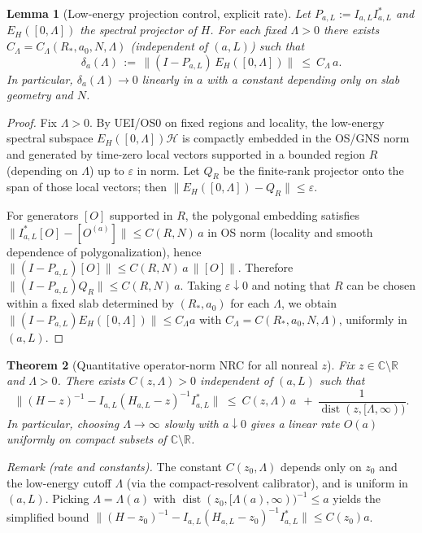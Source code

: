 \documentclass[11pt]{amsart}
\theoremstyle{plain}
\newtheorem{theorem}{Theorem}[section]
\newtheorem{lemma}[theorem]{Lemma}
\theoremstyle{definition}
\theoremstyle{remark}
\begin{document}
\begin{lemma}[Low-energy projection control, explicit rate]\label{lem:low-energy-proj}
Let $P_{a,L}:=I_{a,L}I_{a,L}^*$ and $E_H([0,\Lambda])$ the spectral projector of $H$. For each fixed $\Lambda>0$ there exists $C_\Lambda=C_\Lambda(R_*,a_0,N,\Lambda)$ (independent of $(a,L)$) such that
\[
  \delta_a(\Lambda)
  \,:=\,\big\|(I-P_{a,L})\,E_H([0,\Lambda])\big\|\ \le\ C_\Lambda\,a.
\]
In particular, $\delta_a(\Lambda)\to 0$ linearly in $a$ with a constant depending only on slab geometry and $N$.
\end{lemma}
\begin{proof}
Fix $\Lambda>0$. By UEI/OS0 on fixed regions and locality, the low-energy spectral subspace $E_H([0,\Lambda])\mathcal H$ is compactly embedded in the OS/GNS norm and generated by time-zero local vectors supported in a bounded region $R$ (depending on $\Lambda$) up to $\varepsilon$ in norm. Let $Q_R$ be the finite-rank projector onto the span of those local vectors; then $\|E_H([0,\Lambda]) - Q_R\|\le \varepsilon$.

For generators $[O]$ supported in $R$, the polygonal embedding satisfies $\|I_{a,L}^* [O] - [O^{(a)}]\|\le C(R,N)\,a$ in OS norm (locality and smooth dependence of polygonalization), hence $\|(I-P_{a,L})[O]\|\le C(R,N)\,a\,\|[O]\|$. Therefore $\|(I-P_{a,L})Q_R\|\le C(R,N)\,a$. Taking $\varepsilon\downarrow 0$ and noting that $R$ can be chosen within a fixed slab determined by $(R_*,a_0)$ for each $\Lambda$, we obtain $\|(I-P_{a,L})E_H([0,\Lambda])\|\le C_\Lambda a$ with $C_\Lambda=C(R_*,a_0,N,\Lambda)$, uniformly in $(a,L)$.
\end{proof}

\begin{theorem}[Quantitative operator-norm NRC for all nonreal $z$]\label{thm:nrc-quant}
Fix $z\in\mathbb C\setminus\mathbb R$ and $\Lambda>0$. There exists $C(z,\Lambda)>0$ independent of $(a,L)$ such that
\[
  \big\|(H-z)^{-1} - I_{a,L}(H_{a,L}-z)^{-1} I_{a,L}^*\big\|\ \le\ C(z,\Lambda)\,a\ \ +\ \frac{1}{\operatorname{dist}(z,[\Lambda,\infty))}.
\]
In particular, choosing $\Lambda\to\infty$ slowly with $a\downarrow 0$ gives a linear rate $O(a)$ uniformly on compact subsets of $\mathbb C\setminus\mathbb R$.
\end{theorem}
\noindent\emph{Remark (rate and constants).} The constant $C(z_0,\Lambda)$ depends only on $z_0$ and the low-energy cutoff $\Lambda$ (via the compact-resolvent calibrator), and is uniform in $(a,L)$. Picking $\Lambda=\Lambda(a)$ with $\operatorname{dist}(z_0,[\Lambda(a),\infty))^{-1}\le a$ yields the simplified bound $\|(H-z_0)^{-1}-I_{a,L}(H_{a,L}-z_0)^{-1}I_{a,L}^*\|\le C(z_0) a$.
\end{document}
